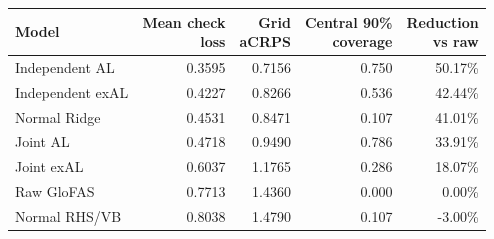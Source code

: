 \begin{tabular*}{\linewidth}{@{\extracolsep{\fill}}lrrrr@{}}
\toprule
Model & \shortstack{Mean check\\loss} & \shortstack{Grid\\aCRPS} & \shortstack{Central 90\%\\coverage} & \shortstack{Reduction\\vs raw} \\
\midrule
Independent AL & 0.3595 & 0.7156 & 0.750 & 50.17\% \\
Independent exAL & 0.4227 & 0.8266 & 0.536 & 42.44\% \\
Normal Ridge & 0.4531 & 0.8471 & 0.107 & 41.01\% \\
Joint AL & 0.4718 & 0.9490 & 0.786 & 33.91\% \\
Joint exAL & 0.6037 & 1.1765 & 0.286 & 18.07\% \\
Raw GloFAS & 0.7713 & 1.4360 & 0.000 & 0.00\% \\
Normal RHS/VB & 0.8038 & 1.4790 & 0.107 & -3.00\% \\
\bottomrule
\end{tabular*}
